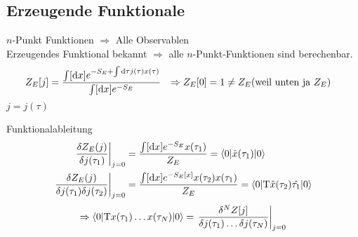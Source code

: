 \subsection{Erzeugende Funktionale}
$n$-Punkt Funktionen $\Rightarrow$ Alle Observablen \\
Erzeugendes Funktional bekannt $\Rightarrow$ alle $n$-Punkt-Funktionen sind berechenbar.
	\begin{align*}
		Z_E [j] &= \frac{\int [\mathrm{d} x] e^{-S_E + \int \mathrm{d} \tau j(\tau) x(\tau)}}{\int[\mathrm{d} x] e^{-S_E}}
		&\Rightarrow Z_E[0] &= 1 \neq Z_E (\text{weil unten ja }Z_E) 
	\end{align*}
$j = j(\tau)$

Funktionalableitung
	\begin{align*}
		\left.\frac{\delta Z_E(j)}{\delta j(\tau_1)} \right|_{j = 0} 
		&= \frac{\int [\mathrm{d} x] e^{-S_E}x(\tau_1)}{Z_E} 
		= \braket{0 | \hat{x} (\tau_1) | 0} \\
		\left.\frac{\delta Z_E(j)}{\delta j (\tau_1) \delta j(\tau_2)} \right|_{j = 0}
		&= \frac{\int [\mathrm{d} x] e^{-S_E[x]} x(\tau_2) x(\tau_1)}{Z_E}
		= \braket{0 | \mathrm{T} \hat{x} (\tau_2) \hat{\tau_1} | 0} 
	\end{align*}
	\begin{align*}
		\Rightarrow \braket{0 | \mathrm{T} x(\tau_1) \ldots x(\tau_N) | 0} = 
		\left.\frac{\delta^N Z[j]}{\delta j(\tau_1) \ldots \delta j(\tau_N)} \right|_{j= 0}
	\end{align*}